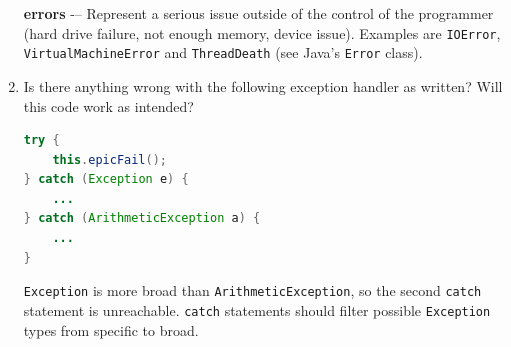 \documentclass[11pt]{article}
\newenvironment{answer}{\large\lstset{basicstyle=\tiny\ttfamily}\color{white} }{}
\newenvironment{answer}{\large\lstset{basicstyle=\large\ttfamily}\color{red} }{}
\begin{document}
\begin{enumerate}
\begin{answer}
\textbf{errors} -– Represent a serious issue outside of the control of the programmer (hard drive
failure, not enough memory, device issue). Examples are \texttt{IOError}, \texttt{VirtualMachineError} and
\texttt{ThreadDeath} (see Java's \texttt{Error} class).
\end{answer}


\vspace{48pt}
\item Is there anything wrong with the following exception handler as written? Will this
code work as intended? 
\begin{lstlisting}[language=java]
try {
	this.epicFail();
} catch (Exception e) {
	...
} catch (ArithmeticException a) {
	...
}
\end{lstlisting}
\begin{answer}
\texttt{Exception} is more broad than \texttt{ArithmeticException}, so the second \texttt{catch} statement is unreachable.  \texttt{catch} statements should filter possible \texttt{Exception} types from specific to broad.
\end{answer}
\newpage




\end{enumerate}
\end{document}
